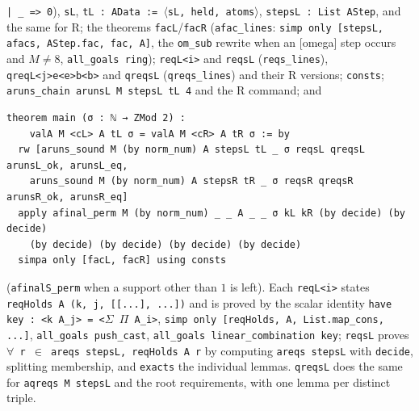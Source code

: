 \textnormal{\texttt{| \_\allowbreak{} => 0}}), \textnormal{\texttt{sL}}, \textnormal{\texttt{tL : AData := \ensuremath{\langle}sL,\allowbreak{} held,\allowbreak{} atoms\ensuremath{\rangle}}}, \textnormal{\texttt{stepsL : List AStep}}, and the
same for R; the theorems \textnormal{\texttt{facL}}/\textnormal{\texttt{facR}} (\textnormal{\texttt{afac\_\allowbreak{}lines}}:
\textnormal{\texttt{simp only [stepsL,\allowbreak{} afacs,\allowbreak{} AStep.\allowbreak{}fac,\allowbreak{} fac,\allowbreak{} A]}}, the \textnormal{\texttt{om\_\allowbreak{}sub}} rewrite when an [omega]
step occurs and $M\ne8$, \textnormal{\texttt{all\_\allowbreak{}goals ring}}); \textnormal{\texttt{reqL<i>}} and \textnormal{\texttt{reqsL}} (\textnormal{\texttt{reqs\_\allowbreak{}lines}}),
\textnormal{\texttt{qreqL<j>e<e>b<b>}} and \textnormal{\texttt{qreqsL}} (\textnormal{\texttt{qreqs\_\allowbreak{}lines}}) and their R versions; \textnormal{\texttt{consts}};
\textnormal{\texttt{aruns\_\allowbreak{}chain arunsL M stepsL tL 4}} and the R command; and
\begin{lstlisting}[style=lean]
theorem main (σ : ℕ → ZMod 2) :
    valA M <cL> A tL σ = valA M <cR> A tR σ := by
  rw [aruns_sound M (by norm_num) A stepsL tL _ σ reqsL qreqsL arunsL_ok, arunsL_eq,
    aruns_sound M (by norm_num) A stepsR tR _ σ reqsR qreqsR arunsR_ok, arunsR_eq]
  apply afinal_perm M (by norm_num) _ _ A _ _ σ kL kR (by decide) (by decide)
    (by decide) (by decide) (by decide) (by decide)
  simpa only [facL, facR] using consts
\end{lstlisting}
(\textnormal{\texttt{afinalS\_\allowbreak{}perm}} when a support other than $1$ is left). Each \textnormal{\texttt{reqL<i>}} states
\textnormal{\texttt{reqHolds A (\allowbreak{}k,\allowbreak{} j,\allowbreak{} [[.\allowbreak{}.\allowbreak{}.\allowbreak{}],\allowbreak{} .\allowbreak{}.\allowbreak{}.\allowbreak{}])}} and is proved by the scalar identity
\textnormal{\texttt{have key : <k A\_\allowbreak{}j> = <\ensuremath{\Sigma} \ensuremath{\Pi} A\_\allowbreak{}i>}}, \textnormal{\texttt{simp only [reqHolds,\allowbreak{} A,\allowbreak{} List.\allowbreak{}map\_\allowbreak{}cons,\allowbreak{} .\allowbreak{}.\allowbreak{}.\allowbreak{}]}},
\textnormal{\texttt{all\_\allowbreak{}goals push\_\allowbreak{}cast}}, \textnormal{\texttt{all\_\allowbreak{}goals linear\_\allowbreak{}combination key}}; \textnormal{\texttt{reqsL}} proves
\textnormal{\texttt{\ensuremath{\forall} r \ensuremath{\in} areqs stepsL,\allowbreak{} reqHolds A r}} by computing \textnormal{\texttt{areqs stepsL}} with \textnormal{\texttt{decide}},
splitting membership, and \textnormal{\texttt{exacts}} the individual lemmas. \textnormal{\texttt{qreqsL}} does the same for
\textnormal{\texttt{aqreqs M stepsL}} and the root requirements, with one lemma per distinct triple.

